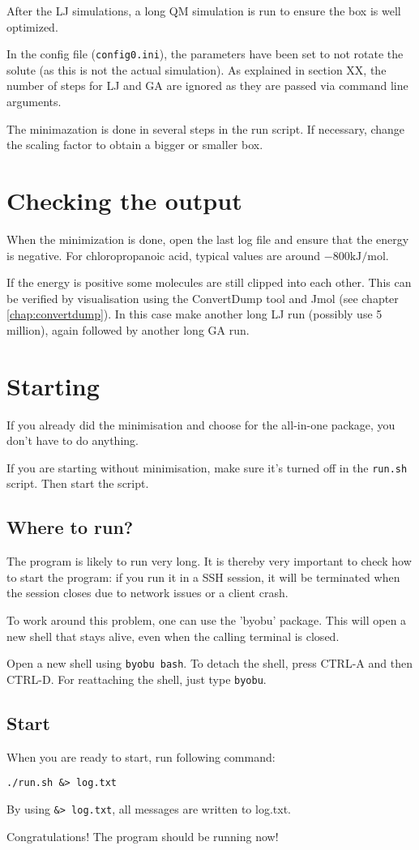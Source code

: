 After the LJ simulations, a long QM simulation is run to ensure the box is well 
optimized.

In the config file (\verb|config0.ini|), the parameters have been set to not 
rotate the solute (as 
this is not the actual simulation). As explained in section XX, the number of 
steps for LJ and GA are ignored as they are passed via command line arguments.

The minimazation is done in several steps in the run script. If necessary, 
change the scaling factor to obtain a bigger or smaller box.


\section{Checking the output}
When the minimization is done, open the last log file and ensure that the 
energy is negative. For chloropropanoic acid, typical values are around $-800 
\textrm {kJ/mol}$.

If the energy is positive some molecules are still clipped into each other. 
This can be verified by visualisation using the ConvertDump tool and Jmol (see 
chapter 
\ref{chap:convertdump}).
In this case make another long LJ run (possibly use 5 million), again followed 
by another long GA run.

\section{Starting}
If you already did the minimisation and choose for the all-in-one package, you 
don't have to do anything.

If you are starting without minimisation, make sure it's turned off in the 
\verb|run.sh| script. Then start the script.

\subsection{Where to run?}
The program is likely to run very long. It is thereby very important to check 
how to start the program: if you run it in a SSH session, it will be terminated 
when the session closes due to network issues or a client crash.

To work around this problem, one can use the 'byobu' package. This will open a 
new shell that stays alive, even when the calling terminal is closed. 

Open a new shell using \verb|byobu bash|. To detach the shell, press CTRL-A and 
then CTRL-D. For reattaching the shell, just type \verb|byobu|.


\subsection{Start}\label{subs:start}
When you are ready to start, run following command:

\begin{lstlisting}[caption=runmin]
./run.sh &> log.txt
\end{lstlisting}

By using \verb|&> log.txt|, all messages are written to log.txt.

Congratulations! The program should be running now!
